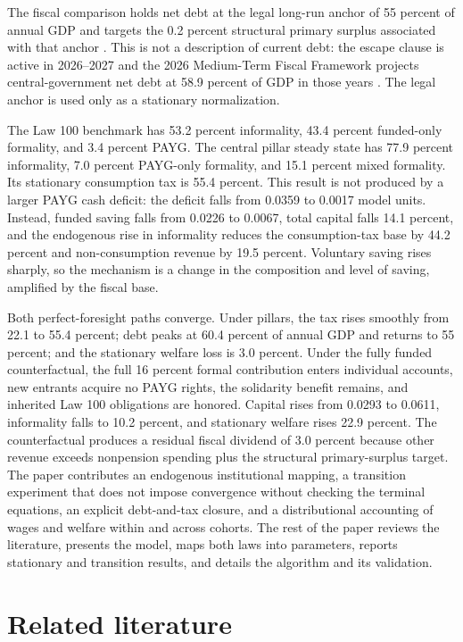 \documentclass[12pt]{article}
\newcommand{\1}{\mathbf{1}}
\begin{document}
The fiscal comparison holds net debt at the legal long-run anchor of 55 percent of annual GDP
and targets the 0.2 percent structural primary surplus associated with that anchor
\citep{Colombia2021FiscalRule}. This is not a description of current debt: the escape clause
is active in 2026--2027 and the 2026 Medium-Term Fiscal Framework projects central-government
net debt at 58.9 percent of GDP in those years \citep{MFMP2026}. The legal anchor is used only
as a stationary normalization.

The Law 100 benchmark has 53.2 percent informality, 43.4 percent funded-only formality, and 3.4
percent PAYG. The central pillar steady state has 77.9 percent informality, 7.0 percent
PAYG-only formality, and 15.1 percent mixed formality. Its stationary consumption tax is 55.4
percent. This result is not produced by a larger PAYG cash deficit: the deficit falls from
0.0359 to 0.0017 model units. Instead, funded saving falls from 0.0226 to 0.0067, total capital
falls 14.1 percent, and the endogenous rise in informality reduces the consumption-tax base by
44.2 percent and non-consumption revenue by 19.5 percent. Voluntary saving rises sharply, so
the mechanism is a change in the composition and level of saving, amplified by the fiscal
base.

Both perfect-foresight paths converge. Under pillars, the tax rises smoothly from 22.1 to 55.4
percent; debt peaks at 60.4 percent of annual GDP and returns to 55 percent; and the stationary
welfare loss is 3.0 percent. Under the fully funded counterfactual, the full 16 percent formal
contribution enters individual accounts, new entrants acquire no PAYG rights, the solidarity
benefit remains, and inherited Law 100 obligations are honored. Capital rises from 0.0293 to
0.0611, informality falls to 10.2 percent, and stationary welfare rises 22.9 percent. The
counterfactual produces a residual fiscal dividend of 3.0 percent because other revenue
exceeds nonpension spending plus the structural primary-surplus target.
The paper contributes an endogenous institutional mapping, a transition experiment that does
not impose convergence without checking the terminal equations, an explicit debt-and-tax
closure, and a distributional accounting of wages and welfare within and across cohorts. The
rest of the paper reviews the literature, presents the model, maps both laws into parameters,
reports stationary and transition results, and details
the algorithm and its validation.

\section{Related literature}
\end{document}
